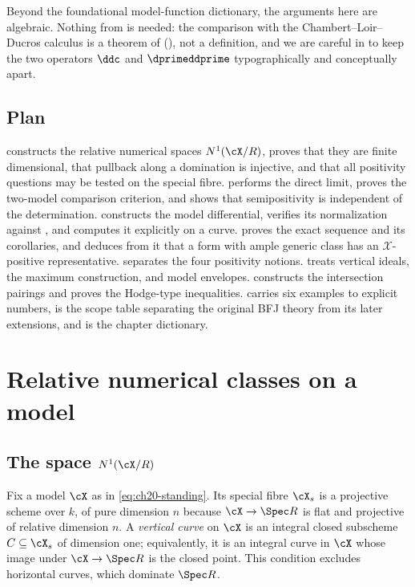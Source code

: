 Beyond the foundational model-function dictionary, the arguments here are
algebraic.  Nothing from  is needed: the comparison with the Chambert--Loir--Ducros
calculus is a theorem of 
(), not a definition, and we are careful in
 to keep the two operators $\ddc$ and
$\dprimeddprime$ typographically and conceptually apart.

\subsection{Plan}
\label{sec:ch20-plan}

 constructs the relative numerical spaces
$N^1(\cX/R)$, proves that they are finite dimensional, that pullback along
a domination is injective, and that all positivity questions may be tested
on the special fibre.   performs the direct
limit, proves the two-model comparison criterion, and shows that
semipositivity is independent of the determination.
 constructs the model differential, verifies its
normalization against , and computes it explicitly
on a curve.   proves the exact sequence and its
corollaries, and  deduces from it
that a form with ample generic class has an $\mathcal X$-positive
representative.   separates the four positivity
notions.   treats vertical ideals, the maximum
construction, and model envelopes.   constructs
the intersection pairings and proves the Hodge-type inequalities.
 carries six examples to explicit numbers,
 is the scope table separating the original BFJ theory
from its later extensions, and  is the chapter
dictionary.

\section{Relative numerical classes on a model}
\label{sec:ch20-numerical}

\subsection{The space \texorpdfstring{$N^1(\cX/R)$}{N1(X/R)}}
\label{sec:ch20-n1}

Fix a model $\cX$ as in \eqref{eq:ch20-standing}.  Its special fibre
$\cX_s$ is a projective scheme over $k$, of pure dimension $n$ because
$\cX\to\Spec R$ is flat and projective of relative dimension $n$.  A
\emph{vertical curve} on $\cX$ is an integral closed subscheme
$C\subseteq\cX_s$ of dimension one; equivalently, it is an integral curve
in $\cX$ whose image under $\cX\to\Spec R$ is the closed point.  This
condition excludes horizontal curves, which dominate $\Spec R$.


